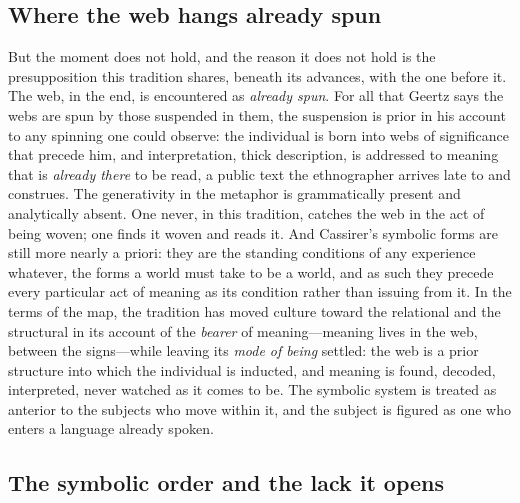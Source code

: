 \subsection*{Where the web hangs already spun}

But the moment does not hold, and the reason it does not hold is the presupposition this tradition shares, beneath its advances, with the one before it. The web, in the end, is encountered as \emph{already spun}. For all that Geertz says the webs are spun by those suspended in them, the suspension is prior in his account to any spinning one could observe: the individual is born into webs of significance that precede him, and interpretation, thick description, is addressed to meaning that is \emph{already there} to be read, a public text the ethnographer arrives late to and construes. The generativity in the metaphor is grammatically present and analytically absent. One never, in this tradition, catches the web in the act of being woven; one finds it woven and reads it. And Cassirer's symbolic forms are still more nearly a priori: they are the standing conditions of any experience whatever, the forms a world must take to be a world, and as such they precede every particular act of meaning as its condition rather than issuing from it. In the terms of the map, the tradition has moved culture toward the relational and the structural in its account of the \emph{bearer} of meaning---meaning lives in the web, between the signs---while leaving its \emph{mode of being} settled: the web is a prior structure into which the individual is inducted, and meaning is found, decoded, interpreted, never watched as it comes to be. The symbolic system is treated as anterior to the subjects who move within it, and the subject is figured as one who enters a language already spoken.

\subsection*{The symbolic order and the lack it opens}

